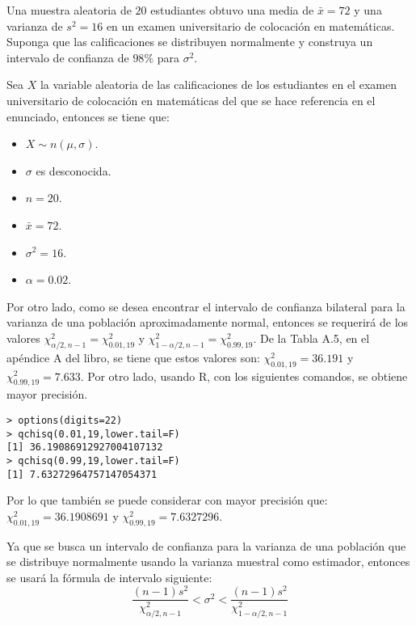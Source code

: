 \begin{enunciado}
 Una muestra aleatoria de $20$ estudiantes obtuvo una media de $\bar{x} = 72$ y una varianza de $s^2 = 16$ en un examen universitario de colocaci\'on en matem\'aticas. Suponga que las calificaciones se distribuyen normalmente y construya un intervalo de confianza de $98\%$ para $\sigma^2$.
\end{enunciado}

\begin{solucion}
 Sea $X$ la variable aleatoria de las calificaciones de los estudiantes en el examen universitario de colocaci\'on en matem\'aticas del que se hace referencia en el enunciado, entonces se tiene que:
 \begin{itemize}
  \item $X \sim n(\mu, \sigma)$.
  \item $\sigma$ es desconocida.
  \item $n = 20$.
  \item $\bar{x} = 72$.
  \item $\sigma^2 = 16$.
  \item $\alpha = 0.02$.
 \end{itemize}
 Por otro lado, como se desea encontrar el intervalo de confianza bilateral para la varianza de una poblaci\'on aproximadamente normal, entonces se requerir\'a de los valores $\chi^2_{\alpha/2,n-1} = \chi^2_{0.01,19}$ y $\chi^2_{1-\alpha/2,n-1} = \chi^2_{0.99,19}$. De la Tabla A.5, en el ap\'endice A del libro, se tiene que estos valores son: $\chi^2_{0.01,19} = 36.191$ y $\chi^2_{0.99,19} = 7.633$. Por otro lado, usando R, con los siguientes comandos, se obtiene mayor precisi\'on.
 \begin{verbatim}
> options(digits=22)
> qchisq(0.01,19,lower.tail=F)
[1] 36.19086912927004107132
> qchisq(0.99,19,lower.tail=F)
[1] 7.63272964757147054371
 \end{verbatim}
 \vspace{-0.5cm}
 Por lo que tambi\'en se puede considerar con mayor precisi\'on que: $\chi^2_{0.01,19} = 36.1908691$ y $\chi^2_{0.99,19} = 7.6327296$.
 \par 
 Ya que se busca un intervalo de confianza para la varianza de una poblaci\'on que se distribuye normalmente usando la varianza muestral como estimador, entonces se usar\'a la f\'ormula de intervalo siguiente:
 \begin{equation*}
  \frac{(n-1)s^2}{\chi^2_{\alpha/2,n-1}} < \sigma^2 < \frac{(n-1)s^2}{\chi^2_{1-\alpha/2,n-1}}
 \end{equation*}

\end{solucion}
